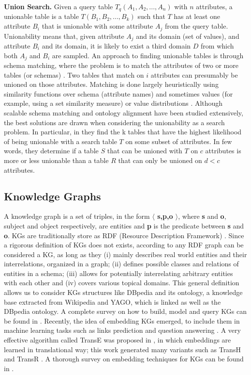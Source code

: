 \textbf{Union Search.} Given a query table $T_q(A_1,A_2,...,A_n)$ with $n$ attributes, a unionable table is a table $T(B_1, B_2,...,B_k)$ such that $T$ has at least one attribute $B_i$ that is unionable with some attribute $A_j$ from the query table. Unionability means that, given attribute $A_j$ and its domain (set of values), and attribute $B_i$ and its domain, it is likely to exist a third domain $D$ from which both $A_j$ and $B_i$ are sampled. An approach to finding unionable tables is through schema matching, where the problem is to match the attributes of two or more tables (or schemas) \cite{he2003statistical,rahm2011towards}. Two tables that match on $i$ attributes can presumably be unioned on those attributes. Matching is done largely heuristically using similarity functions over schema (attribute names) and sometimes values (for example, using a set similarity measure) or value distributions \cite{kang2003schema}. Although scalable schema matching and ontology alignment have been studied extensively, the best solutions are drawn when considering the unionability as a search problem. In particular, in \cite{nargesian2018table} they find the k tables that have the highest likelihood of being unionable with a search table $T$ on some subset of attributes. In few words, they determine if a table $S$ that can be unioned with $T$ on $c$ attributes is more or less unionable than a table $R$ that can only be unioned on $d < c$ attributes.

\subsection{Knowledge Graphs}
A knowledge graph is a set of triples, in the form \textbf{$\langle$ s,p,o $\rangle$}, where \textbf{s} and \textbf{o}, subject and object respectively, are entities and \textbf{p} is the predicate between \textbf{s} and \textbf{o}. KGs are traditionally store as RDF (Resource Description Framework) \cite{colazzo2014rdf}. Since a rigorous definition of KGs does not exists, according to \cite{paulheim2017knowledge} any RDF graph can be considered a KG, as long as they (i) mainly describes real world entities and their interrelations, organized in a graph; (ii) defines possible classes and relations of entities in a schema; (iii) allows for potentially interrelating arbitrary entities with each other and (iv) covers various topical domains. This general definition allows us to consider KGs structures like DBpedia \cite{lehmann2015dbpedia} and its ontology, a knowledge base extracted from Wikipedia and YAGO, \cite{suchanek2007yago} which is linked as well as the DBpedia ontology. A complete survey on how to build, model and query KGs can be found in \cite{ji2020survey}.
Recently, the idea of embedding KGs emerged, to include them in machine learning tasks such as links prediction \cite{rossi2020knowledge} and question answering \cite{huang2019knowledge}. A very effective algorithm called TransE was proposed in \cite{bordes2013translating}, in which embeddings are learned in translational way; this work generated many variants such as TransH \cite{wang2014knowledge} and TransR \cite{lin2015learning}. A thorough survey on embedding techniques for KGs can be found in \cite{goyal2018graph}.

